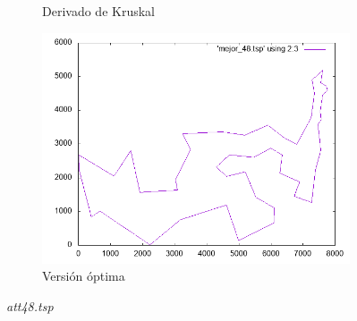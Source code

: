 \documentclass[12pt,spanish]{article}
\begin{document}
\begin{figure}[H]
\begin{subfigure}[b]{0.36\textwidth}
\caption{Derivado de Kruskal}
\end{subfigure}
\quad
\begin{subfigure}[b]{0.36\textwidth}
\includegraphics[width=\textwidth]{att48_mejor.png}
\caption{Versión óptima}
\end{subfigure}
\caption{\textit{att48.tsp}}
\end{figure}
\end{document}
